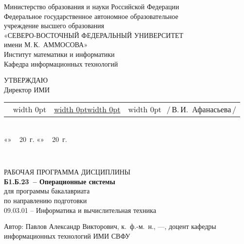 \documentclass[a4paper,12pt]{article}
\makeatletter
\newcommand{\ulfield}[3]{
  \noindent
  \begin{tabularx}{\linewidth}{@{}l@{}X@{}l@{}}
  #1\if\relax\detokenize{#1}\relax\else\,~\vrule width 0pt\fi 
  & \uline{\vrule width 0pt\hfill#2\hfill\vrule width 0pt} & 
  \if\relax\detokenize{#3}\relax\else\vrule width 0pt~\,\fi #3
  \end{tabularx}
  }
\newcommand{\datefield}[1][]{\if
  \relax\detokenize{#1}\relax
  «\uline{\hspace{22pt}}»~\uline{\hspace{90pt}}\,~20\uline{\hspace{20pt}}~г.\else 
  «\uline{\hspace{18pt}}»~\uline{\hspace{60pt}}\,~20\uline{\hspace{18pt}}~г.\fi
  }
\makeatother
\begin{document}
\sloppy
\thispagestyle{empty}

\noindent
\begin{center}
Министерство образования и науки Российской Федерации \\
Федеральное государственное автономное образовательное \\
учреждение высшего образования\\
«СЕВЕРО-ВОСТОЧНЫЙ ФЕДЕРАЛЬНЫЙ УНИВЕРСИТЕТ \\
имени М.\,К.~АММОСОВА» \\
Институт математики и информатики \\
Кафедра информационных технологий

\vspace{12mm}
\begin{flushright}
\parbox{80mm}{
УТВЕРЖДАЮ\\
Директор ИМИ\\[2mm]
\ulfield{}{}{/\,В.\,И.~Афанасьева\,/}{}\\[1mm]
\datefield
\\[20mm]
}
\end{flushright}


РАБОЧАЯ ПРОГРАММА ДИСЦИПЛИНЫ
\\[2mm]
\textbf{Б1.Б.23\ -- Операционные системы} 
\\[5mm]

для программы бакалавриата\\
по направлению подготовки \\
09.03.01 -- Информатика и вычислительная техника
\\[15mm]


\parbox{\textwidth}{
 Автор: Павлов Александр Викторович, к.~ф.-м.~н., ---, доцент кафедры информационных технологий ИМИ СВФУ

}
\bigskip



\end{center}
\end{document}
